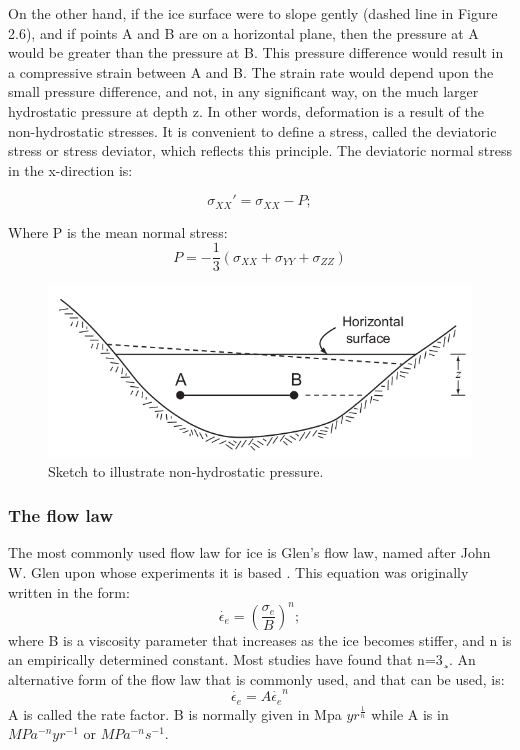 \documentclass{article}
\begin{document}
On the other hand, if the ice surface were to slope gently (dashed line in
Figure 2.6), and if points A and B are on a horizontal plane, then the pressure at A would be greater than the pressure at B. This pressure difference would result in a compressive strain between A and B. The strain rate would depend upon the small pressure difference, and not, in any signiﬁcant way, on the much larger hydrostatic pressure at depth z. In other words, deformation is a result of the non-hydrostatic stresses. It is convenient to deﬁne a stress, called the deviatoric stress or stress deviator, which reﬂects this principle. The deviatoric normal stress in the x-direction is:

\begin{equation}
	\sigma_{XX}'= \sigma_{XX}-P;
\end{equation}

Where P is the mean normal stress:
\begin{equation}
	P=-\frac{1}{3}({\sigma_{XX}+\sigma_{YY}+\sigma_{ZZ}})
\end{equation}

\begin{figure}[!h]
	\centering
	\includegraphics[width=0.7\linewidth]{../fig/Non_hydrostatic_pressure.png}
	\caption{Sketch to illustrate non-hydrostatic pressure.}
	\label{Deviatoric_stress}
\end{figure}

\subsubsection{The flow law}

The most commonly used ﬂow law for ice is Glen’s ﬂow law, named after John
W. Glen upon whose experiments it is based \cite{glen1958flow}. This equation was originally written in the form:
\begin{equation}
	\dot{\epsilon_{e}}=({\frac{\sigma_{e}}{B}})^n;
\end{equation}
where B is a viscosity parameter that increases as the ice becomes stiffer, and n is an empirically determined constant. Most studies have found that n=3¸. An alternative form of the ﬂow law that is commonly used, and that can be used, is:
\begin{equation}
	\dot{\epsilon_{e}}=A\dot{\epsilon_{e}}^n
\end{equation}
A is called the rate factor. B is normally given in Mpa $yr^{\frac{1}{n}}$ while A is in $MPa^{-n} yr ^{-1}$ or $MPa^{-n} s ^{-1}$.
\end{document}
